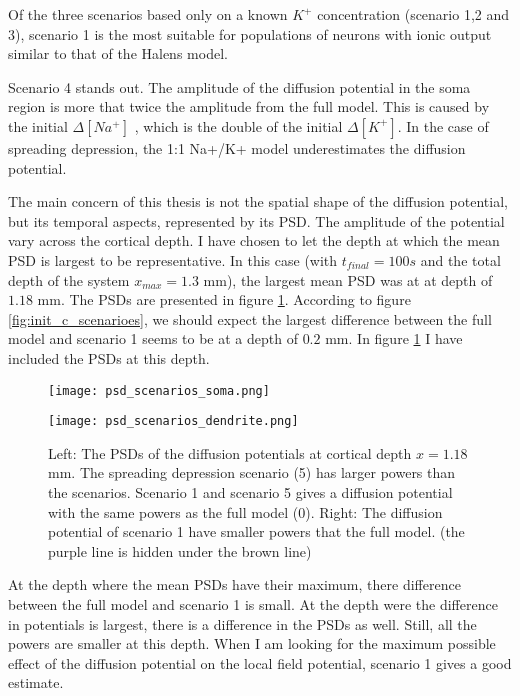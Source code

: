 \documentclass{article}
\begin{document}
Of the three scenarios based only on a known $K^+$ concentration (scenario 1,2 and 3), scenario 1 is the most suitable for populations of neurons with ionic output similar to that of the Halens model.

Scenario 4 stands out. The amplitude of the diffusion potential in the soma region is more that twice the amplitude from the full model. This is caused by the initial $\Delta [Na^+]$ , which is the double of the initial $\Delta[K^+]$. In the case of spreading depression, the 1:1 Na+/K+ model underestimates the diffusion potential. 

The main concern of this thesis is not the spatial shape of the diffusion potential, but its temporal aspects, represented by its PSD. The amplitude of the potential vary across the cortical depth. I have chosen to let the depth at which the mean PSD is largest to be representative. In this case (with $t_{final}=100s$ and the total depth of the system $x_{max} = 1.3$ mm), the largest mean PSD was at at depth of $1.18$ mm. The PSDs are presented in figure \ref{fig:psd_scenarios}.  According to figure \ref{fig:init_c_scenarioes}, we should expect the largest difference between the full model and scenario 1 seems to be at a depth of $0.2$ mm. In figure \ref{fig:psd_scenarios} I have included the PSDs at this depth. 

\begin{figure}[!tbp]
  \centering
  \begin{minipage}[b]{0.45\textwidth}
    \texttt{[image: psd\_scenarios\_soma.png]}

  \end{minipage}
\hfill
  \begin{minipage}[b]{0.45\textwidth}
    \texttt{[image: psd\_scenarios\_dendrite.png]}

  \end{minipage}
  \label{fig:psd_scenarios}
  \caption{Left: The PSDs of the diffusion potentials at cortical depth $x=1.18$ mm. The spreading depression scenario (5) has larger powers than the scenarios. Scenario 1 and scenario 5 gives a diffusion potential with the same powers as the full model (0). 
  Right: The diffusion potential of scenario 1 have smaller powers that the full model. (the purple line is hidden under the brown line) }

\end{figure} 

At the depth where the mean PSDs have their maximum, there difference between the full model and scenario 1 is small. At the depth were the difference in potentials is largest, there is a difference in the PSDs as well. Still, all the powers are smaller at this depth. When I am looking for the maximum possible effect of the diffusion potential on the local field potential, scenario 1 gives a good estimate. 
\end{document}
